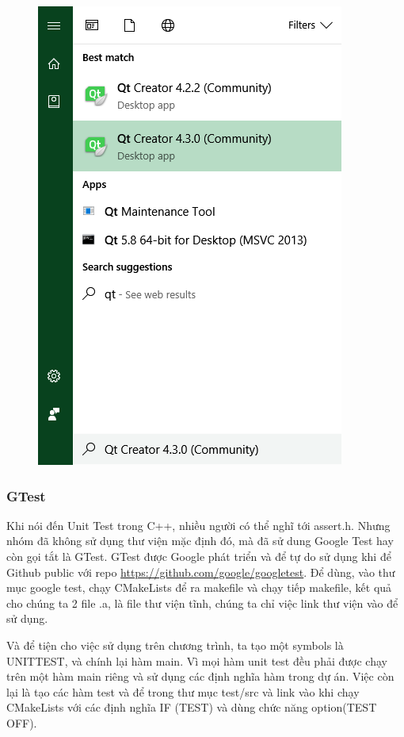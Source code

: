 \documentclass[12pt,a4paper]{report}
\begin{document}
\begin{enumerate}
\begin{figure}[H]
                    \includegraphics[scale = .7]{Qtstep7.png}
                \end{figure}
            \end{enumerate}
            \subsubsection{GTest}
            Khi nói đến Unit Test trong C++, nhiều người có thể nghĩ tới assert.h. Nhưng nhóm đã không sử dụng thư viện mặc định đó, mà đã sử dung Google Test hay còn gọi tắt là GTest. GTest được Google phát triển và để tự do sử dụng khi để Github public với repo \url{https://github.com/google/googletest}. Để dùng, vào thư mục google test, chạy CMakeLists để ra makefile và chạy tiếp makefile, kết quả cho chúng ta 2 file .a, là file thư viện tĩnh, chúng ta chỉ việc link thư viện vào để sử dụng.\par
            Và để tiện cho việc sử dụng trên chương trình, ta tạo một symbols là UNITTEST, và chính lại hàm main. Vì mọi hàm unit test đều phải được chạy trên một hàm main riêng và sử dụng các định nghĩa hàm trong dự án. Việc còn lại là tạo các hàm test và để trong thư mục test/src và link vào khi chạy CMakeLists với các định nghĩa IF (TEST) và dùng chức năng option(TEST OFF).
\end{document}
